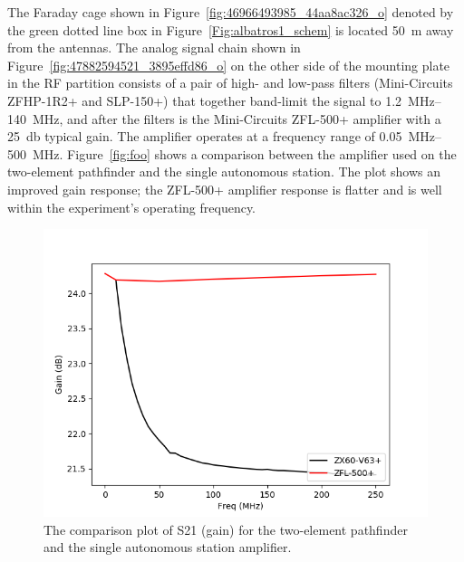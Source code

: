 The Faraday cage shown in Figure~\ref{fig:46966493985_44aa8ac326_o} denoted by the green dotted line box in Figure~\ref{Fig:albatros1_schem} is located \SI{50}{\meter} away from the antennas. The analog signal chain shown in Figure~\ref{fig:47882594521_3895effd86_o} on the other side of the mounting plate in the RF partition consists of a pair of high- and low-pass filters (Mini-Circuits ZFHP-1R2+ and SLP-150+) that together band-limit the signal to \SIrange{1.2}{140}{\mega\hertz}, and after the filters is the Mini-Circuits ZFL-500+ amplifier with a \SI{25}{\decibel} typical gain. The amplifier operates at a frequency range of \SIrange{0.05}{500}{\mega\hertz}. Figure~\ref{fig:foo} shows a comparison between the amplifier used on the two-element pathfinder and the single autonomous station. The plot shows an improved gain response; the ZFL-500+ amplifier response is flatter and is well within the experiment's operating frequency.

\begin{figure}
	\begin{center}
		\includegraphics[width=0.8\linewidth]{Figures/foo.png}
		\caption{The comparison plot of S21 (gain) for the two-element pathfinder and the single autonomous station amplifier.}
		\label{Fig:foo}
	\end{center}
\end{figure}

